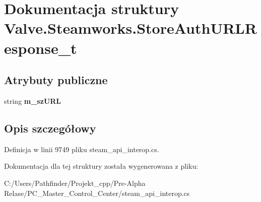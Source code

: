\hypertarget{struct_valve_1_1_steamworks_1_1_store_auth_u_r_l_response__t}{}\section{Dokumentacja struktury Valve.\+Steamworks.\+Store\+Auth\+U\+R\+L\+Response\+\_\+t}
\label{struct_valve_1_1_steamworks_1_1_store_auth_u_r_l_response__t}
\subsection*{Atrybuty publiczne}
\begin{DoxyCompactItemize}
\item 
\mbox{\label{struct_valve_1_1_steamworks_1_1_store_auth_u_r_l_response__t_a621cb3f5aa5f9a7a33cf7388a3ac1ee3}} 
string {\bfseries m\+\_\+sz\+U\+RL}
\end{DoxyCompactItemize}


\subsection{Opis szczegółowy}


Definicja w linii 9749 pliku steam\+\_\+api\+\_\+interop.\+cs.



Dokumentacja dla tej struktury została wygenerowana z pliku\+:\begin{DoxyCompactItemize}
\item 
C\+:/\+Users/\+Pathfinder/\+Projekt\+\_\+cpp/\+Pre-\/\+Alpha Relase/\+P\+C\+\_\+\+Master\+\_\+\+Control\+\_\+\+Center/steam\+\_\+api\+\_\+interop.\+cs\end{DoxyCompactItemize}
